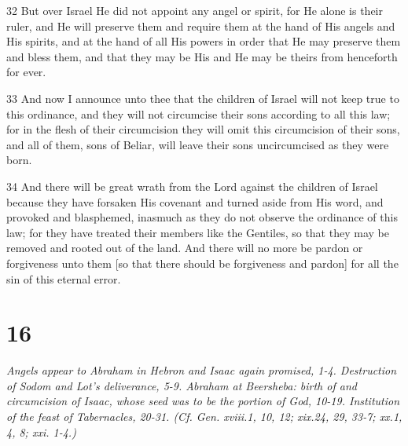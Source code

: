 \par 32 But over Israel He did not appoint any angel or spirit, for He alone is their ruler, and He will preserve them and require them at the hand of His angels and His spirits, and at the hand of all His powers in order that He may preserve them and bless them, and that they may be His and He may be theirs from henceforth for ever.
\par 33 And now I announce unto thee that the children of Israel will not keep true to this ordinance, and they will not circumcise their sons according to all this law; for in the flesh of their circumcision they will omit this circumcision of their sons, and all of them, sons of Beliar, will leave their sons uncircumcised as they were born.
\par 34 And there will be great wrath from the Lord against the children of Israel because they have forsaken His covenant and turned aside from His word, and provoked and blasphemed, inasmuch as they do not observe the ordinance of this law; for they have treated their members like the Gentiles, so that they may be removed and rooted out of the land. And there will no more be pardon or forgiveness unto them [so that there should be forgiveness and pardon] for all the sin of this eternal error.

\chapter{16}

\par \textit{Angels appear to Abraham in Hebron and Isaac again promised, 1-4. Destruction of Sodom and Lot's deliverance, 5-9. Abraham at Beersheba: birth of and circumcision of Isaac, whose seed was to be the portion of God, 10-19. Institution of the feast of Tabernacles, 20-31. (Cf. Gen. xviii.1, 10, 12; xix.24, 29, 33-7; xx.1, 4, 8; xxi. 1-4.)}

